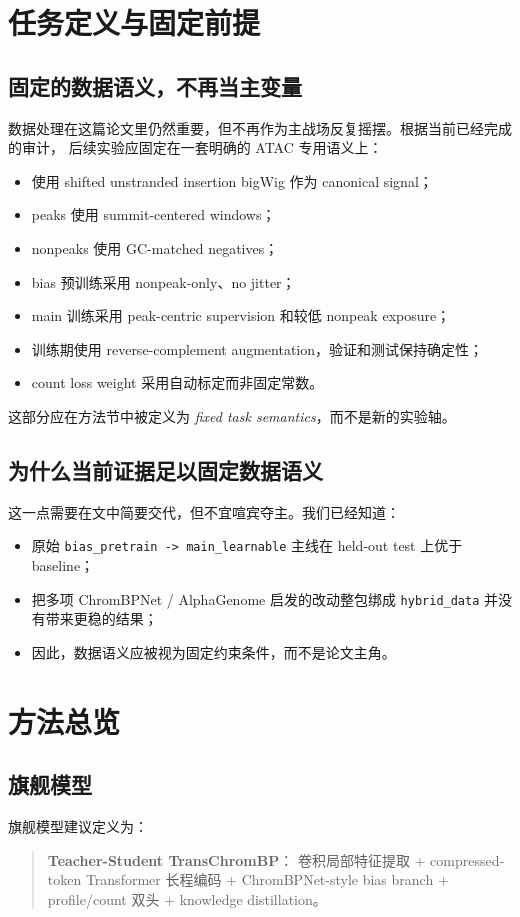 \documentclass[11pt,a4paper]{ctexart}
\begin{document}
\section{任务定义与固定前提}

\subsection{固定的数据语义，不再当主变量}
数据处理在这篇论文里仍然重要，但不再作为主战场反复摇摆。根据当前已经完成的审计，
后续实验应固定在一套明确的 ATAC 专用语义上：
\begin{itemize}[leftmargin=2em]
  \item 使用 shifted unstranded insertion bigWig 作为 canonical signal；
  \item peaks 使用 summit-centered windows；
  \item nonpeaks 使用 GC-matched negatives；
  \item bias 预训练采用 nonpeak-only、no jitter；
  \item main 训练采用 peak-centric supervision 和较低 nonpeak exposure；
  \item 训练期使用 reverse-complement augmentation，验证和测试保持确定性；
  \item count loss weight 采用自动标定而非固定常数。
\end{itemize}

这部分应在方法节中被定义为 \emph{fixed task semantics}，而不是新的实验轴。

\subsection{为什么当前证据足以固定数据语义}
这一点需要在文中简要交代，但不宜喧宾夺主。我们已经知道：
\begin{itemize}[leftmargin=2em]
  \item 原始 \texttt{bias\_pretrain -> main\_learnable} 主线在 held-out test 上优于 baseline；
  \item 把多项 ChromBPNet / AlphaGenome 启发的改动整包绑成 \texttt{hybrid\_data} 并没有带来更稳的结果；
  \item 因此，数据语义应被视为固定约束条件，而不是论文主角。
\end{itemize}

\section{方法总览}

\subsection{旗舰模型}
旗舰模型建议定义为：
\begin{quote}
\textbf{Teacher-Student TransChromBP}：
卷积局部特征提取 + compressed-token Transformer 长程编码 +
ChromBPNet-style bias branch + profile/count 双头 + knowledge distillation。
\end{quote}
\end{document}
